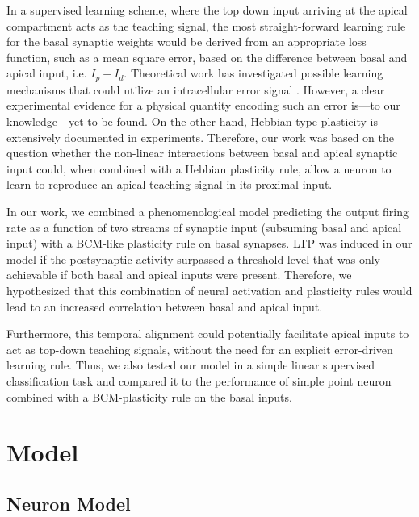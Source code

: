 \documentclass[10pt,a4paper,twocolumn]{article}
\begin{document}
		In a supervised learning scheme, where the top down input
		arriving at the apical compartment acts as the teaching signal,
		the most straight-forward learning rule for the basal synaptic
		weights would be derived from an appropriate loss function,
		such as a mean square error, based on the difference between 
		basal and apical input, i.e. $I_p - I_d$. Theoretical work has 
		investigated possible learning mechanisms
		that could utilize an intracellular error signal
		\citep{Urbanczik_2014,Schiess_2016,Guerguiev_2017}.
		However, a clear experimental
		evidence for a physical quantity encoding such an error 
		is---to our knowledge---yet to be found. 
		On the other hand, Hebbian-type plasticity is extensively
		documented in experiments. Therefore, our work was
		based on the question whether the non-linear interactions
		between basal and apical synaptic input could, when
		combined with a Hebbian plasticity rule, allow a neuron
		to learn to reproduce an apical teaching signal in its
		proximal input.
		
		In our work, we combined a phenomenological model predicting the output
		firing rate as a function of two streams of synaptic input (subsuming basal and apical input)
		with a BCM-like plasticity rule on basal synapses. LTP was induced in our model 
		if the postsynaptic activity surpassed a threshold level that was only achievable if 
		both basal and apical inputs were present. Therefore, we hypothesized that 
		this combination of neural activation and plasticity rules would lead to an
		increased correlation between basal and apical input.
		
		Furthermore, this temporal alignment could potentially facilitate apical inputs to act
		as top-down teaching signals, without the need for an explicit error-driven
		learning rule. Thus, we also tested our model in a simple linear 
		supervised classification task and compared it to the performance of simple
		point neuron combined with a BCM-plasticity rule on the basal inputs.
		
		\section{Model}
		
		\subsection{Neuron Model}
		
\end{document}

